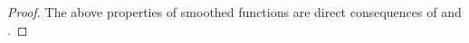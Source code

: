 \documentclass[letterpaper, 10 pt, conference]{ieeeconf}
\newcommand{\E}{\mathbb{E}}
\newcommand{\?}{\stackrel{?}{=}}
\newcommand{\ballUnit}{\mathbb{B}}
\newcommand{\samplingRadius}{\delta}
\newcommand{\samplingVariable}{q}
\newcommand{\exampleFunction}{h}
\newcommand{\exampleFunctionSmoothed}{\tilde{\exampleFunction}}
\newcommand{\varExample}{z}
\newcommand{\exampleInputDim}{m}
\newcommand{\lipschitz}{\ell}
\newcommand{\unif}{\text{Unif}}
\begin{document}
\begin{proof}
The above properties of smoothed functions are direct consequences of \cite[Lemma 1]{Flaxman2005OnlineConvexOptimization} and 
\cite[Sec. 4.2]{Bravo2018BanditLearninginConcaveNPersonGames}.
\end{proof}

\end{document}
